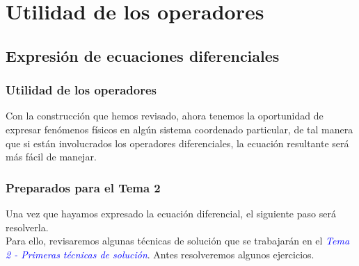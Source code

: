 \documentclass[12pt]{beamer}
\begin{document}
\section{Utilidad de los operadores}
\subsection{Expresión de ecuaciones diferenciales}

\begin{frame}
\frametitle{Utilidad de los operadores}
Con la construcción que hemos revisado, ahora tenemos la oportunidad de expresar fenómenos físicos en algún sistema coordenado particular, de tal manera que si están involucrados los operadores diferenciales, la ecuación resultante será más fácil de manejar.
\end{frame}
\begin{frame}
\frametitle{Preparados para el Tema 2}
Una vez que hayamos expresado la ecuación diferencial, el siguiente paso será resolverla.
\\
\bigskip
\pause
Para ello, revisaremos algunas técnicas de solución que se trabajarán en el \emph{\textcolor{blue}{Tema 2 - Primeras técnicas de solución}}. Antes resolveremos algunos ejercicios.
\end{frame}
\end{document}

